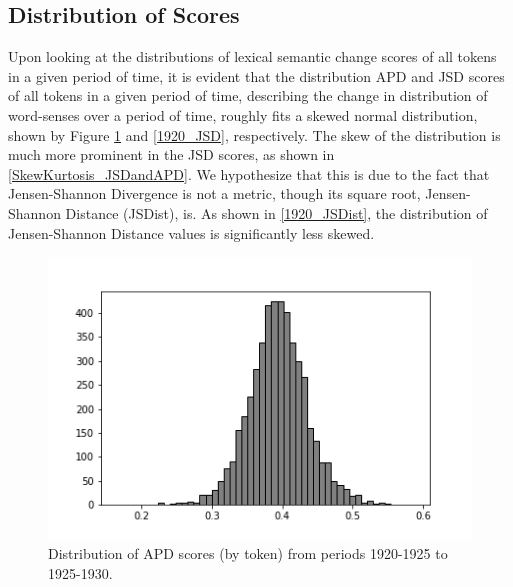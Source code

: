 \documentclass[10pt, a4paper]{article}
\begin{document}
\subsection{Distribution of Scores}
Upon looking at the distributions of lexical semantic change scores of all tokens in a given period of time, it is evident that the distribution APD and JSD scores of all tokens in a given period of time, describing the change in distribution of word-senses over a period of time, roughly fits a skewed normal distribution, shown by Figure \ref{1920_APD} and \ref{1920_JSD}, respectively. The skew of the distribution is much more prominent in the JSD scores, as shown in \ref{SkewKurtosis_JSDandAPD}. We hypothesize that this is due to the fact that Jensen-Shannon Divergence is not a metric, though its square root, Jensen-Shannon Distance (JSDist), is. As shown in \ref{1920_JSDist}, the distribution of Jensen-Shannon Distance values is significantly less skewed.


\begin{figure}[!h]
\begin{center}
\includegraphics[scale=0.5]{code/distribution_imgs/1920_APD.png}
\caption{Distribution of APD scores (by token) from periods 1920-1925 to 1925-1930.}
\label{1920_APD}
\end{center}
\end{figure}
\end{document}
